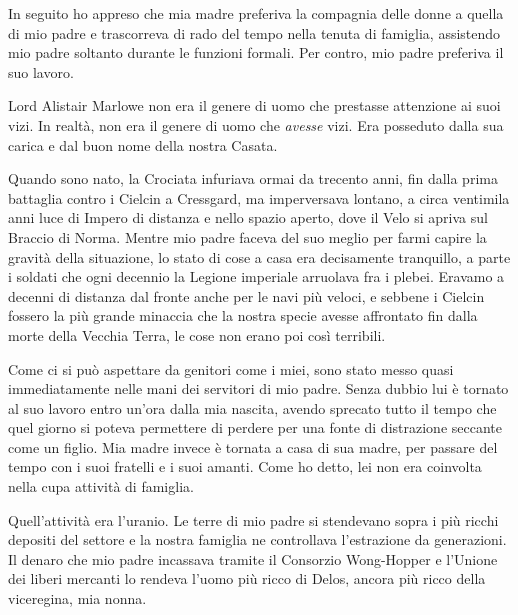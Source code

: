 In seguito ho appreso che mia madre preferiva la compagnia delle donne a
quella di mio padre e trascorreva di rado del tempo nella tenuta di
famiglia, assistendo mio padre soltanto durante le funzioni formali. Per
contro, mio padre preferiva il suo lavoro.

Lord Alistair Marlowe non era il genere di uomo che prestasse attenzione
ai suoi vizi. In realtà, non era il genere di uomo che \emph{avesse}
vizi. Era posseduto dalla sua carica e dal buon nome della nostra
Casata.

Quando sono nato, la Crociata infuriava ormai da trecento anni, fin
dalla prima battaglia contro i Cielcin a Cressgard, ma imperversava
lontano, a circa ventimila anni luce di Impero di distanza e nello
spazio aperto, dove il Velo si apriva sul Braccio di Norma. Mentre mio
padre faceva del suo meglio per farmi capire la gravità della
situazione, lo stato di cose a casa era decisamente tranquillo, a parte
i soldati che ogni decennio la Legione imperiale arruolava fra i plebei.
Eravamo a decenni di distanza dal fronte anche per le navi più veloci, e
sebbene i Cielcin fossero la più grande minaccia che la nostra specie
avesse affrontato fin dalla morte della Vecchia Terra, le cose non erano
poi così terribili.

Come ci si può aspettare da genitori come i miei, sono stato messo quasi
immediatamente nelle mani dei servitori di mio padre. Senza dubbio lui è
tornato al suo lavoro entro un'ora dalla mia nascita, avendo sprecato
tutto il tempo che quel giorno si poteva permettere di perdere per una
fonte di distrazione seccante come un figlio. Mia madre invece è tornata
a casa di sua madre, per passare del tempo con i suoi fratelli e i suoi
amanti. Come ho detto, lei non era coinvolta nella cupa attività di
famiglia.

Quell'attività era l'uranio. Le terre di mio padre si stendevano sopra i
più ricchi depositi del settore e la nostra famiglia ne controllava
l'estrazione da generazioni. Il denaro che mio padre incassava tramite
il Consorzio Wong-Hopper e l'Unione dei liberi mercanti lo rendeva
l'uomo più ricco di Delos, ancora più ricco della viceregina, mia nonna.

